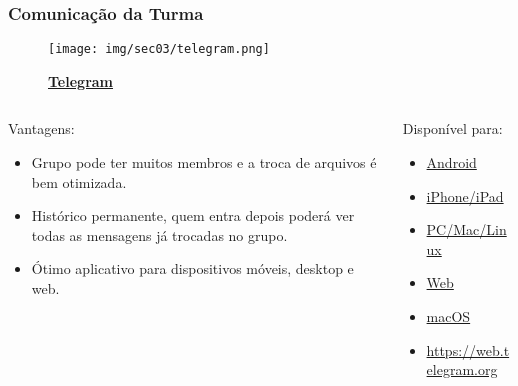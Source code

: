 \begin{frame}[t]\frametitle{Comunicação da Turma}

  \begin{figure}[htb]
    \centering{}
    \texttt{[image: img/sec03/telegram.png]}

    \textbf{\href{https://telegram.org}{Telegram}}
  \end{figure}

  \begin{columns}[onlytextwidth,T]

    \begin{column}{0.48\linewidth}
      \begin{block}{Vantagens:}
        \begin{itemize}
          \justifying{}
          \item Grupo pode ter muitos membros e a troca de arquivos é bem otimizada.
          \item Histórico permanente, quem entra depois poderá ver todas as mensagens já trocadas no grupo.
          \item Ótimo aplicativo para dispositivos móveis, desktop e web.
        \end{itemize}
      \end{block}
    \end{column}

    \begin{column}{0.48\linewidth}
      \begin{block}{Disponível para:}
        \begin{itemize}
          \justifying{}
          \item \href{https://telegram.org/dl/android}{Android}
          \item \href{https://telegram.org/dl/ios}{iPhone/iPad}
          \item \href{https://desktop.telegram.org}{PC/Mac/Linux}
          \item \href{https://web.telegram.org}{Web}
          \item \href{https://macos.telegram.org}{macOS}
          \item \href{https://web.telegram.org}{https://web.telegram.org}
        \end{itemize}
      \end{block}
    \end{column}

  \end{columns}

\end{frame}
